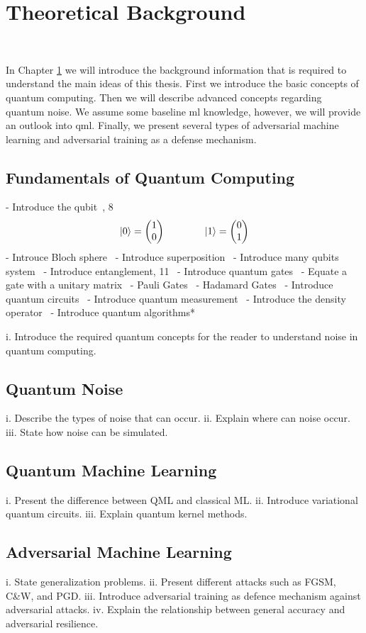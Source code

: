 \chapter{Theoretical Background}\label{chapter:background} \

In Chapter \ref{chapter:background} we will introduce the
background information that is required to understand
the main ideas of this thesis. First we introduce
the basic concepts of quantum computing. Then we will
describe advanced concepts regarding quantum noise. We
assume some baseline \ac{ml} knowledge, however, we
will provide an outlook into \ac{qml}. Finally, we
present several types of adversarial machine learning
and adversarial training as a defense mechanism. \

\section{Fundamentals of Quantum Computing}
- Introduce the qubit~\cite{schumacher}, 8 \
\begin{equation}\label{eq:qubit}
    \ket{0} = \begin{pmatrix}
                1 \\ 0
              \end{pmatrix} \qquad \qquad
    \ket{1} = \begin{pmatrix}
                0 \\ 1
              \end{pmatrix}
\end{equation}
    - Introuce Bloch sphere \
    - Introduce superposition \
    - Introduce many qubits system \
    - Introduce entanglement, 11 \ 
- Introduce quantum gates \
    - Equate a gate with a unitary matrix \
    - Pauli Gates \
    - Hadamard Gates \
- Introduce quantum circuits \
- Introduce quantum measurement \
- Introduce the density operator \
- Introduce quantum algorithms* \

i.	Introduce the required quantum concepts for the reader to understand noise in quantum computing.

\section{Quantum Noise}
i.	Describe the types of noise that can occur.
ii.	Explain where can noise occur.
iii.	State how noise can be simulated.

\section{Quantum Machine Learning}
i.	Present the difference between QML and classical ML\@.
ii.	Introduce variational quantum circuits.
iii.	Explain quantum kernel methods.

\section{Adversarial Machine Learning}
i.	State generalization problems.
ii.	Present different attacks such as FGSM, C\&W, and PGD\@.
iii.	Introduce adversarial training as defence mechanism against adversarial attacks.
iv.	Explain the relationship between general accuracy and adversarial resilience.